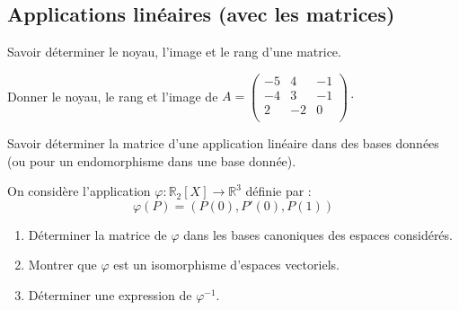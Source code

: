 \documentclass[a4paper,twoside,french,10pt]{VcCours}
\begin{document}
\medskip

\subsection{Applications linéaires (avec les matrices)}

\begin{ptc}{}
	Savoir déterminer le noyau, l'image et le rang d'une matrice.
\end{ptc} 

\begin{Exercice}{}\end{Exercice} Donner le noyau, le rang et l'image de $A = \begin{pmatrix}
-5 & 4 & -1 \\
-4 & 3 & - 1 \\
2 	 & -2 & 0 \\
\end{pmatrix}\cdot$

\medskip

\begin{ptc}{}
	Savoir déterminer la matrice d'une application linéaire dans des bases données (ou pour un endomorphisme dans une base donnée).
\end{ptc}

\medskip

\begin{Exercice}{}\end{Exercice} On considère l'application $\varphi : \mathbb{R}_2[X] \rightarrow \mathbb{R}^3$ définie par :
\[ \varphi(P)=(P(0),P'(0),P(1)) \]

\begin{enumerate}
\item Déterminer la matrice de $\varphi$ dans les bases canoniques des espaces considérés.
\item Montrer que $\varphi$ est un isomorphisme d'espaces vectoriels.
\item Déterminer une expression de $\varphi^{-1}$.
\end{enumerate}

\medskip
\end{document}

